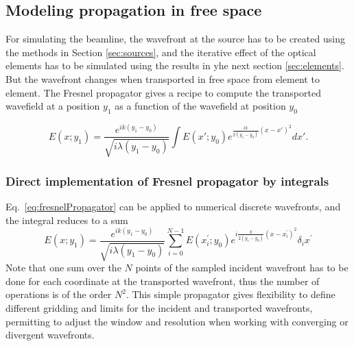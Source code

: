 \documentclass[]{spie}  %
\begin{document}
\subsection{Modeling propagation in free space}
\label{sec:propagation}

For simulating the beamline, the wavefront at the source has to be created using the methods in Section \ref{sec:sources}, and the iterative effect of the optical elements has to be simulated using the results in yhe next section \ref{sec:elements}. But the wavefront changes when transported in free space from element to element. The Fresnel propagator \cite{goodmanfourier} gives a recipe to compute the transported wavefield at a position $y_1$ as a function of the wavefield at position $y_0$

\begin{equation}\label{eq:fresnelPropagator}
E(x;y_1) =  \frac{e^{i k (y_1-y_0)}}{\sqrt{i \lambda (y_1-y_0)}} \int E(x';y_0) e^{ \frac{i k}{2 (y_1-y_0)}  (x-x')^2  }  dx'.
\end{equation}

\subsubsection{Direct implementation of Fresnel propagator by integrals}
\label{sec:integralPropagator}

Eq.~\ref{eq:fresnelPropagator} can be applied to numerical discrete wavefronts, and the integral reduces to a sum
\begin{equation}\label{eq:discretefresnel1D}
 E(x;y_1) = \frac {e^{i k (y_1-y_0) }}{ \sqrt{i \lambda (y_1-y_0)}} \sum_{i=0}^{N-1}  E(x^\prime_i; y_0) e^{i \frac{k}{2 (y_1-y_0)} (x - x_i^\prime)^2 } \delta_i x^\prime
\end{equation}
Note that one sum over the $N$ points of the sampled incident wavefront has to be done for each coordinate at the transported wavefront, thus the number of operations is of the order $N^2$. This simple propagator gives flexibility to define different gridding and limits for the incident and transported wavefronts, permitting to adjust the window and resolution when working with converging or divergent wavefronts. 
\end{document}
